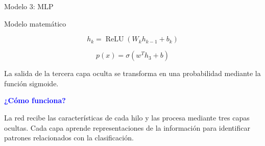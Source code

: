 \documentclass[12pt, aspectratio=43]{beamer}
\begin{document}
\begin{frame}{Modelo 3: MLP}

\begin{block}{Modelo matemático}

\[
h_k=\operatorname{ReLU}(W_kh_{k-1}+b_k)
\]

\[
\boxed{
p(x)=\sigma(w^Th_3+b)
}
\]

\small
La salida de la tercera capa oculta se transforma en una
probabilidad mediante la función sigmoide.

\end{block}

\textbf{\textcolor{blue}{¿Cómo funciona?}}

La red recibe las características de cada hilo y las procesa mediante tres capas ocultas. Cada capa aprende representaciones de la información para identificar patrones relacionados con la clasificación.
\end{frame}
\end{document}
